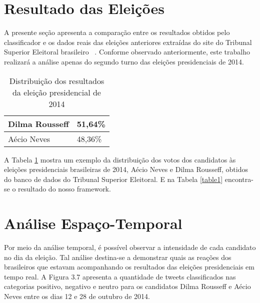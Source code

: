  
 
 \section{Resultado das Eleições}
 
A presente seção apresenta a comparação
 entre os resultados obtidos pelo classificador e os dados
 reais das eleições anteriores extraídas do site do
 Tribunal Superior  Eleitoral brasileiro ~\cite{TSE}. Conforme observado anteriormente, este trabalho realizará a análise apenas do segundo turno das eleições presidenciais de 2014.
 
 \begin{table}[tbp]
     \centering
     \caption{Distribuição dos resultados da eleição presidencial de 2014}
     \label{tb:eleicoes2014}
     \begin{tabular}{ll}
     \hline
     Dilma Rousseff & 51,64\% \\ \hline
     Aécio Neves & 48,36\% \\ \hline
     \end{tabular}
 \end{table}
 
 A Tabela \ref{tb:eleicoes2014} mostra um exemplo da distribuição dos votos
 dos candidatos às eleições presidenciais brasileiras de 2014,
 Aécio Neves e Dilma Rousseff, obtidos do banco de dados do
 Tribunal Superior Eleitoral. E na Tabela \ref{table1} encontra-se o resultado do nosso framework. 
 
 
 
 \section{Análise Espaço-Temporal}
 
 
 Por meio da análise temporal, é possível observar a intensidade de cada candidato no dia da eleição. Tal análise destina-se a demonstrar quais as reações dos brasileiros que estavam acompanhando os resultados das eleições presidenciais em tempo real. A Figura 3.7 apresenta a quantidade de tweets classificados nas categorias positivo, negativo e neutro para os candidatos Dilma Rousseff e Aécio Neves entre os dias 12 e 28 de outubro de 2014.
 
